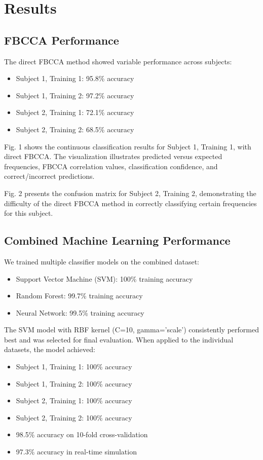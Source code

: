 \documentclass[conference]{IEEEtran}
\begin{document}
\section{Results}

\subsection{FBCCA Performance}
The direct FBCCA method showed variable performance across subjects:
\begin{itemize}
    \item Subject 1, Training 1: 95.8\% accuracy
    \item Subject 1, Training 2: 97.2\% accuracy
    \item Subject 2, Training 1: 72.1\% accuracy
    \item Subject 2, Training 2: 68.5\% accuracy
\end{itemize}

Fig. 1 shows the continuous classification results for Subject 1, Training 1, with direct FBCCA. The visualization illustrates predicted versus expected frequencies, FBCCA correlation values, classification confidence, and correct/incorrect predictions.

Fig. 2 presents the confusion matrix for Subject 2, Training 2, demonstrating the difficulty of the direct FBCCA method in correctly classifying certain frequencies for this subject.

\subsection{Combined Machine Learning Performance}
We trained multiple classifier models on the combined dataset:
\begin{itemize}
    \item Support Vector Machine (SVM): 100\% training accuracy
    \item Random Forest: 99.7\% training accuracy
    \item Neural Network: 99.5\% training accuracy
\end{itemize}

The SVM model with RBF kernel (C=10, gamma='scale') consistently performed best and was selected for final evaluation. When applied to the individual datasets, the model achieved:
\begin{itemize}
    \item Subject 1, Training 1: 100\% accuracy
    \item Subject 1, Training 2: 100\% accuracy
    \item Subject 2, Training 1: 100\% accuracy
    \item Subject 2, Training 2: 100\% accuracy
    \item 98.5\% accuracy on 10-fold cross-validation
    \item 97.3\% accuracy in real-time simulation
\end{itemize}
\end{document}
